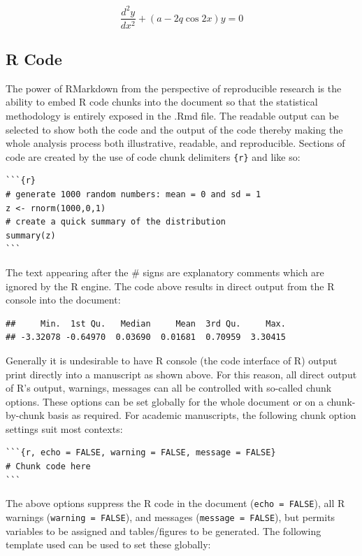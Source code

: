 \documentclass[]{elsarticle} %
\begin{document}
\[\frac{d^2y}{dx^2} + (a-2q\cos2x)y = 0\]

\hypertarget{r-code}{%
\subsection{R Code}\label{r-code}}

The power of RMarkdown from the perspective of reproducible research is
the ability to embed R code chunks into the document so that the
statistical methodology is entirely exposed in the .Rmd file. The
readable output can be selected to show both the code and the output of
the code thereby making the whole analysis process both illustrative,
readable, and reproducible. Sections of code are created by the use of
code chunk delimiters
\texttt{\textasciigrave{}\textasciigrave{}\textasciigrave{}\{r\}} and
\texttt{\textasciigrave{}\textasciigrave{}\textasciigrave{}} like so:

\begin{verbatim}
```{r}
# generate 1000 random numbers: mean = 0 and sd = 1
z <- rnorm(1000,0,1)
# create a quick summary of the distribution
summary(z)
```
\end{verbatim}

The text appearing after the \# signs are explanatory comments which are
ignored by the R engine. The code above results in direct output from
the R console into the document:

\begin{verbatim}
##     Min.  1st Qu.   Median     Mean  3rd Qu.     Max. 
## -3.32078 -0.64970  0.03690  0.01681  0.70959  3.30415
\end{verbatim}

Generally it is undesirable to have R console (the code interface of R)
output print directly into a manuscript as shown above. For this reason,
all direct output of R's output, warnings, messages can all be
controlled with so-called chunk options. These options can be set
globally for the whole document or on a chunk-by-chunk basis as
required. For academic manuscripts, the following chunk option settings
suit most contexts:

\begin{verbatim}
```{r, echo = FALSE, warning = FALSE, message = FALSE}
# Chunk code here
```
\end{verbatim}

The above options suppress the R code in the document
(\texttt{echo\ =\ FALSE}), all R warnings (\texttt{warning\ =\ FALSE}),
and messages (\texttt{message\ =\ FALSE}), but permits variables to be
assigned and tables/figures to be generated. The following template used
can be used to set these globally:
\end{document}
